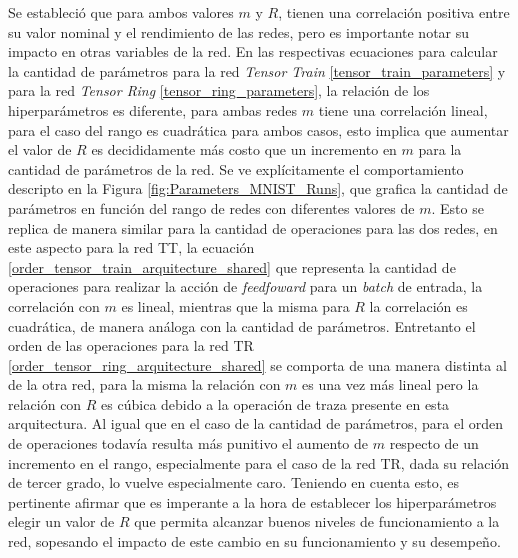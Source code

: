 \documentclass[spanish]{article}
\theoremstyle{definition}
\theoremstyle{remark}
\numberwithin{equation}{section}
\numberwithin{equation}{section} %
\begin{document}
\par
Se estableció que para ambos valores $m$ y $R$, tienen una correlación positiva entre su valor nominal y el rendimiento de las redes, pero es importante notar su impacto en otras variables de la red. En las respectivas ecuaciones para calcular la cantidad de parámetros para la red \textit{Tensor Train} \eqref{tensor_train_parameters} y para la red \textit{Tensor Ring} \eqref{tensor_ring_parameters}, la relación de los hiperparámetros es diferente, para ambas redes $m$ tiene una correlación lineal, para el caso del rango es cuadrática para ambos casos, esto implica que aumentar el valor de $R$ es decididamente más costo que un incremento en $m$ para la cantidad de parámetros de la red. Se ve explícitamente el comportamiento descripto en la Figura \ref{fig:Parameters_MNIST_Runs}, que grafica la cantidad de parámetros en función del rango de redes con diferentes valores de $m$. Esto se replica de manera similar para la cantidad de operaciones para las dos redes, en este aspecto para la red TT, la ecuación \eqref{order_tensor_train_arquitecture_shared} que representa la cantidad de operaciones para realizar la acción de \textit{feedfoward} para un \textit{batch} de entrada, la correlación con $m$ es lineal, mientras que la misma para $R$ la correlación es cuadrática, de manera análoga con la cantidad de parámetros. Entretanto el orden de las operaciones para la red TR \eqref{order_tensor_ring_arquitecture_shared} se comporta de una manera distinta al de la otra red, para la misma la relación con $m$ es una vez más lineal pero la relación con $R$ es cúbica debido a la operación de traza presente en esta arquitectura. Al igual que en el caso de la cantidad de parámetros, para el orden de operaciones todavía resulta más punitivo el aumento de $m$ respecto de un incremento en el rango, especialmente para el caso de la red TR, dada su relación de tercer grado, lo vuelve especialmente caro. Teniendo en cuenta esto, es pertinente afirmar que es imperante a la hora de establecer los hiperparámetros elegir un valor de $R$ que permita alcanzar buenos niveles de funcionamiento a la red, sopesando el impacto de este cambio en su funcionamiento y su desempeño.
\par
\end{document}
